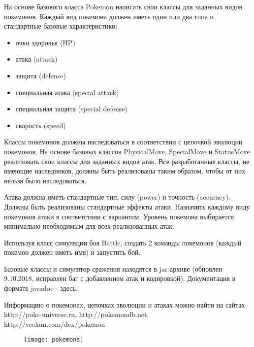 На основе базового класса Pokemon написать свои классы для заданных видов покемонов. Каждый вид покемона должен иметь один или два типа и стандартные базовые характеристики:

\begin{itemize}
	\item очки здоровья (HP)
	\item атака (attack)
	\item защита (defense)
	\item специальная атака (special attack)
	\item специальная защита (special defense)
	\item скорость (speed)
\end{itemize}

Классы покемонов должны наследоваться в соответствии с цепочкой эволюции покемонов. На основе базовых классов PhysicalMove, SpecialMove и StatusMove реализовать свои классы для заданных видов атак. Все разработанные классы, не имеющие наследников, должны быть реализованы таким образом, чтобы от них нельзя было наследоваться.

Атака должна иметь стандартные тип, силу (power) и точность (accuracy). Должны быть реализованы стандартные эффекты атаки. Назначить каждому виду покемонов атаки в соответствии с вариантом. Уровень покемона выбирается минимально необходимым для всех реализованных атак.

Используя класс симуляции боя Battle, создать 2 команды покемонов (каждый покемон должен иметь имя) и запустить бой.

Базовые классы и симулятор сражения находятся в jar-архиве (обновлен 9.10.2018, исправлен баг с добавлением атак и кодировкой). Документация в формате javadoc - здесь.

Информацию о покемонах, цепочках эволюции и атаках можно найти на сайтах http://poke-universe.ru, http://pokemondb.net, http://veekun.com/dex/pokemon

\begin{figure}[h]
	\centering
	\texttt{[image: pokemons]}
\end{figure}